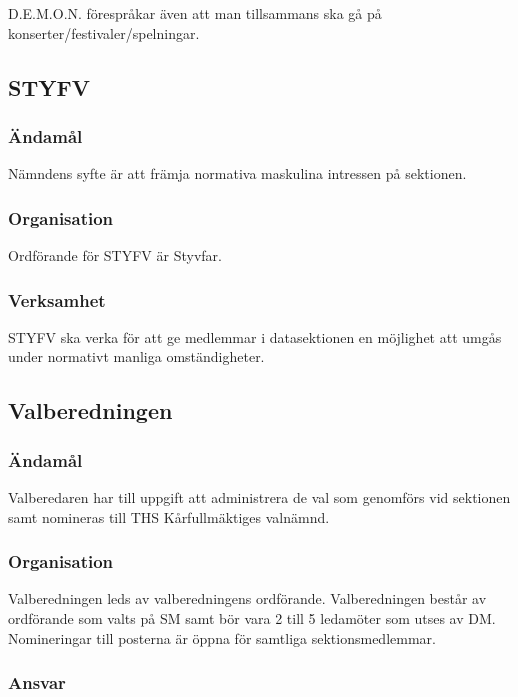\documentclass{dgovdoc}
\begin{document}
D.E.M.O.N. förespråkar även att man tillsammans ska gå på
konserter/festivaler/spelningar.

\subsection{STYFV}

\subsubsection{Ändamål}

Nämndens syfte är att främja normativa maskulina intressen på sektionen.

\subsubsection{Organisation}

Ordförande för STYFV är Styvfar.

\subsubsection{Verksamhet}

STYFV ska verka för att ge medlemmar i datasektionen en möjlighet att umgås
under normativt manliga omständigheter.

\subsection{Valberedningen}

\subsubsection{Ändamål}

Valberedaren har till uppgift att administrera de val som genomförs vid
sektionen samt nomineras till THS Kårfullmäktiges valnämnd.

\subsubsection{Organisation}

Valberedningen leds av valberedningens ordförande. Valberedningen består av
ordförande som valts på SM samt bör vara 2 till 5 ledamöter som utses av DM.
Nomineringar till posterna är öppna för samtliga sektionsmedlemmar.

\subsubsection{Ansvar}
\end{document}
